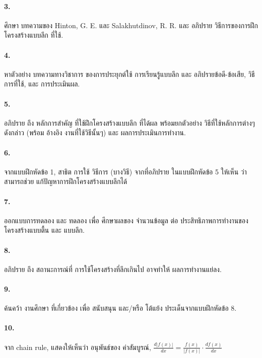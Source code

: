 \paragraph{3.} 
ศึกษา บทความของ Hinton, G. E. และ Salakhutdinov, R. R.\cite{HintonSalakhutdinov2006a} และ อภิปราย วิธีการของการฝึกโครงสร้างแบบลึก ที่ใช้.

\paragraph{4.} 
หาตัวอย่าง บทความทางวิชาการ ของการประยุกต์ใช้ การเรียนรู้แบบลึก และ อภิปรายข้อดี-ข้อเสีย, วิธีการที่ใช้, และ การประเมินผล.

\paragraph{5.} 
อภิปราย ถึง หลักการสำคัญ ที่ใช้ฝึกโครงสร้างแบบลึก ที่ได้ผล พร้อมยกตัวอย่าง วิธีที่ใช้หลักการต่างๆ ดังกล่าว (พร้อม อ้างอิง งานที่ใช้วิธีนั้นๆ) และ ผลการประเมินการทำงาน.

\paragraph{6.} 
จากแบบฝึกหัดข้อ 1, สาธิต การใช้ วิธีการ (บางวิธี) จากที่อภิปราย ในแบบฝึกหัดข้อ 5 ให้เห็น ว่าสามารถช่วย แก้ปัญหาการฝึกโครงสร้างแบบลึกได้

\paragraph{7.} 
ออกแบบการทดลอง และ ทดลอง เพื่อ ศึกษาผลของ จำนวนข้อมูล ต่อ ประสิทธิภาพการทำงานของ โครงสร้างแบบตื้น และ แบบลึก.

\paragraph{8.} 
อภิปราย ถึง สถานะการณ์ที่ การใช้โครงสร้างที่ลึกเกินไป อาจทำให้ ผลการทำงานแย่ลง.

\paragraph{9.} 
ค้นคว้า งานศึกษา ที่เกี่ยวข้อง เพื่อ สนับสนุน และ/หรือ โต้แย้ง ประเด็นจากแบบฝึกหัดข้อ 8.

\paragraph{10.}
จาก chain rule, แสดงให้เห็นว่า อนุพันธ์ของ ค่าสัมบูรณ์, $\frac{d | f(x) |}{d x} = \frac{f(x)}{|f(x)|} \cdot \frac{d f(x)}{d x}$

